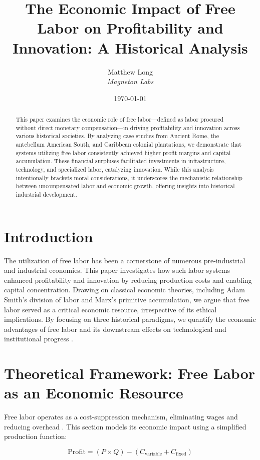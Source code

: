 \documentclass[12pt]{article}
\title{The Economic Impact of Free Labor on Profitability and Innovation: A Historical Analysis}
\author{%
  Matthew Long\\
  \textit{Magneton Labs}%
}
\date{\today}
\begin{document}
\maketitle

\begin{abstract}
This paper examines the economic role of free labor---defined as labor procured without direct monetary compensation---in driving profitability and innovation across various historical societies. By analyzing case studies from Ancient Rome, the antebellum American South, and Caribbean colonial plantations, we demonstrate that systems utilizing free labor consistently achieved higher profit margins and capital accumulation. These financial surpluses facilitated investments in infrastructure, technology, and specialized labor, catalyzing innovation. While this analysis intentionally brackets moral considerations, it underscores the mechanistic relationship between uncompensated labor and economic growth, offering insights into historical industrial development.
\end{abstract}

\section{Introduction}
The utilization of free labor has been a cornerstone of numerous pre-industrial and industrial economies. This paper investigates how such labor systems enhanced profitability and innovation by reducing production costs and enabling capital concentration. Drawing on classical economic theories, including Adam Smith's division of labor and Marx's primitive accumulation, we argue that free labor served as a critical economic resource, irrespective of its ethical implications. By focusing on three historical paradigms, we quantify the economic advantages of free labor and its downstream effects on technological and institutional progress \cite{williams1944}.

\section{Theoretical Framework: Free Labor as an Economic Resource}
Free labor operates as a cost-suppression mechanism, eliminating wages and reducing overhead \cite{fogel1974}. This section models its economic impact using a simplified production function:

\[
\text{Profit} = (P \times Q) - (C_{\text{variable}} + C_{\text{fixed}})
\]
\end{document}

